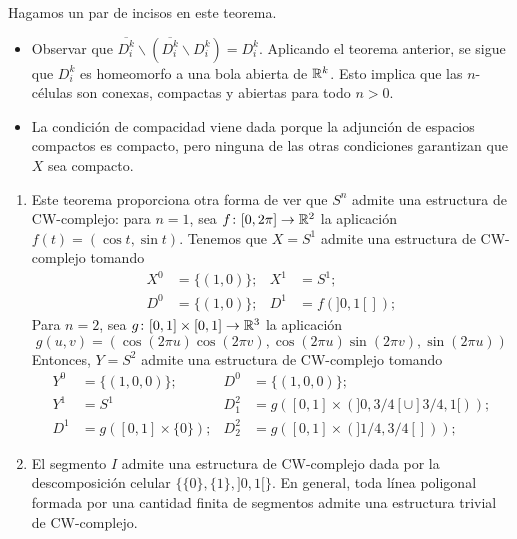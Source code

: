 Hagamos un par de incisos en este teorema.

\begin{itemize}
\item Observar que $\overline{D^k_i}\backslash(\overline{D^k_i}\backslash
D^k_i)=D^k_i$. Aplicando el teorema anterior, se sigue que $D^k_i$ es
homeomorfo a una bola abierta de $\mathbb{R}^k$. Esto implica que las $n$-células
son conexas, compactas y abiertas para todo $n > 0$.
\item La condición de compacidad viene dada porque la adjunción de espacios
compactos es compacto, pero ninguna de las otras condiciones garantizan que
$X$ sea compacto.
\end{itemize}

\begin{example}
\begin{enumerate}
\item Este teorema proporciona otra forma de ver que $S^n$ admite una
estructura de CW-complejo: para $n=1$, sea $f\colon [0,2\pi] \to \mathbb{R}^2$ la
aplicación $f(t)=(\cos t,\sin t)$. Tenemos que $X=S^1$ admite una estructura
de CW-complejo tomando
\begin{align*}
X^0&=\{(1,0)\}; 	& X^1&=S^1;\\
D^0&=\{(1,0)\}; 	& D^1&=f(]0,1[]);
\end{align*}
Para $n=2$, sea $g\colon [0,1]\times [0,1] \to \mathbb{R}^3$ la aplicación
\[g(u,v)=(\cos(2\pi u)\cos(2\pi v),\cos(2\pi u)\sin(2\pi v),\sin(2\pi u))\]
Entonces, $Y=S^2$ admite una estructura de CW-complejo tomando
\begin{align*}
Y^0		&=\{(1,0,0)\}; 	& D^0&=\{(1,0,0)\};\\
Y^1 	&=S^1 			&
D^2_1	&=g([0,1]\times(]0,3/4[\cup]3/4,1[));\\
D^1 	&=g([0,1]\times\{0\});	&
D^2_2	&=g([0,1]\times(]1/4,3/4[]));
\end{align*}
\item El segmento $I$ admite una estructura de CW-complejo dada por la
descomposición celular $\{\{0\},\{1\},]0,1[\}$. En general, toda línea
poligonal formada por una cantidad finita de segmentos admite una estructura
trivial de CW-complejo.
\end{enumerate}
\end{example}

